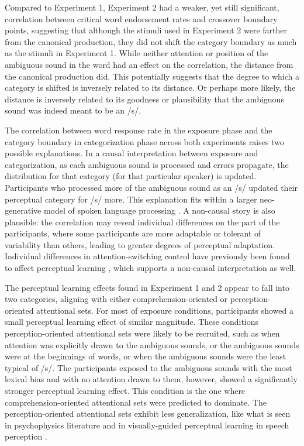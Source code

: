 Compared to Experiment 1, Experiment 2 had a weaker, yet still significant, correlation between critical word endorsement rates and crossover boundary points, suggesting that although the stimuli used in Experiment 2 were farther from the canonical production, they did not shift the category boundary as much as the stimuli in Experiment 1.  
While neither attention or position of the ambiguous sound in the word had an effect on the correlation, the distance from the canonical production did.  
This potentially suggests that the degree to which a category is shifted is inversely related to its distance.  
Or perhaps more likely, the distance is inversely related to its goodness or plausibility that the ambiguous sound was indeed meant to be an /s/.

The correlation between word response rate in the exposure phase and the category boundary in categorization phase across both experiments raises two possible explanations. 
In a causal interpretation between exposure and categorization, as each ambiguous sound is processed and errors propagate, the distribution for that category (for that particular speaker) is updated.
Participants who processed more of the ambiguous sound as an /s/ updated their perceptual category for /s/ more. 
This explanation fits within a larger neo-generative model of spoken language processing \citep{Pierrehumbert2002}.  
A non-causal story is also plausible:  the correlation may reveal individual differences on the part of the participants, where some participants are more adaptable or tolerant of variability than others, leading to greater degrees of perceptual adaptation. 
Individual differences in attention-switching control have previously been found to affect perceptual learning \citep{Scharenborg2014}, which supports a non-causal interpretation as well.

The perceptual learning effects found in Experiment 1 and 2 appear to fall into two categories, aligning with either comprehension-oriented or perception-oriented attentional sets.  
For most of exposure conditions, participants showed a small perceptual learning effect of similar magnitude.
These conditions perception-oriented attentional sets were likely to be recruited, such as when attention was explicitly drawn to the ambiguous sounds, or the ambiguous sounds were at the beginnings of words, or when the ambiguous sounds were the least typical of /s/.
The participants exposed to the ambiguous sounds with the most lexical bias and with no attention drawn to them, however, showed a significantly stronger perceptual learning effect.
This condition is the one where comprehension-oriented attentional sets were predicted to dominate.
The perception-oriented attentional sets exhibit less generalization, like what is seen in psychophysics literature and  in visually-guided perceptual learning in speech perception \citep{Reinisch2014}.

